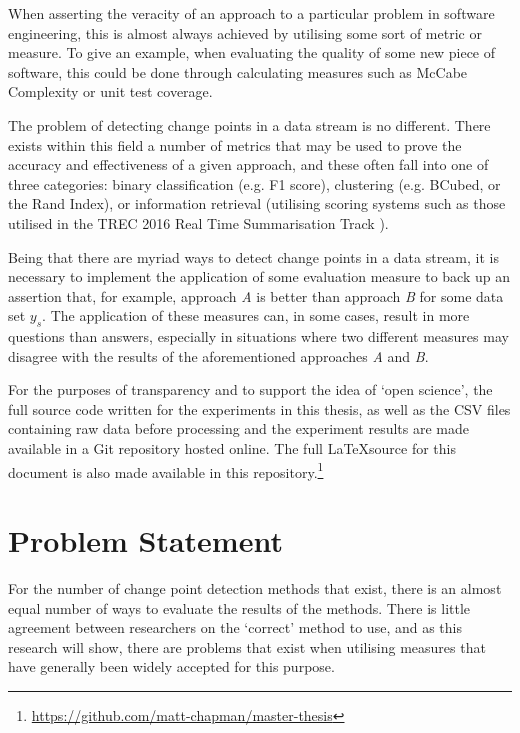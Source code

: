 \documentclass[../main.tex]{subfiles}
\begin{document}
When asserting the veracity of an approach to a particular problem in software engineering, this is almost always achieved by utilising some sort of metric or measure. To give an example, when evaluating the quality of some new piece of software, this could be done through calculating measures such as McCabe Complexity \cite{ThomasJ.McCabe1976} or unit test coverage.

The problem of detecting change points in a data stream is no different. There exists within this field a number of metrics that may be used to prove the accuracy and effectiveness of a given approach, and these often fall into one of three categories: binary classification (e.g. F1 score), clustering (e.g. BCubed, or the Rand Index), or information retrieval (utilising scoring systems such as those utilised in the TREC 2016 Real Time Summarisation Track \cite{trec2016}).

Being that there are myriad ways to detect change points in a data stream, it is necessary to implement the application of some evaluation measure to back up an assertion that, for example, approach \emph{A} is better than approach \emph{B} for some data set $y_s$. The application of these measures can, in some cases, result in more questions than answers, especially in situations where two different measures may disagree with the results of the aforementioned approaches \emph{A} and \emph{B}.

For the purposes of transparency and to support the idea of `open science', the full source code written for the experiments in this thesis, as well as the CSV files containing raw data before processing and the experiment results are made available in a Git repository hosted online. The full \LaTeX source for this document is also made available in this repository.\footnote{\url{https://github.com/matt-chapman/master-thesis}}

\section{Problem Statement}
\label{Problem Statement}

For the number of change point detection methods that exist, there is an almost equal number of ways to evaluate the results of the methods. There is little agreement between researchers on the `correct' method to use, and as this research will show, there are problems that exist when utilising measures that have generally been widely accepted for this purpose.
\end{document}

